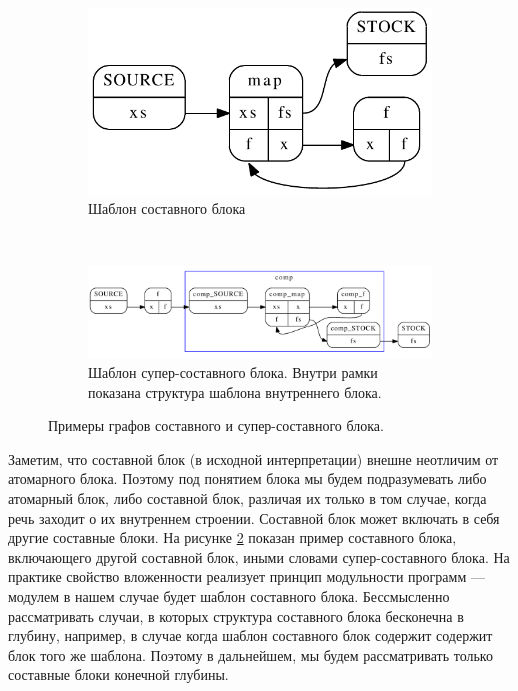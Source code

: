 \documentclass[10pt,a4paper]{article}
\begin{document}
\begin{figure}[H]
  \centering
  \begin{subfigure}[b]{0.3\textwidth}
    \centering
    \includegraphics[width=\textwidth]{example_cg.pdf}
    \caption{Шаблон составного блока}
    \label{example:composite}
  \end{subfigure}
  ~
  \begin{subfigure}[b]{1.0\textwidth}
    \centering
    \includegraphics[width=\textwidth]{cc_cg.pdf}
    \caption{Шаблон супер-составного блока. Внутри рамки показана структура шаблона внутреннего блока.}
    \label{example:supercomposite}
  \end{subfigure}
  
  \caption{ Примеры графов составного и супер-составного блока.}
  \label{example}
\end{figure}

Заметим, что составной блок (в исходной интерпретации) внешне неотличим от атомарного блока.
Поэтому под понятием блока мы будем подразумевать либо атомарный блок, либо составной блок,
различая их только в том случае, когда речь заходит о их внутреннем строении. Составной блок может включать в себя другие составные блоки.
На рисунке \ref{example:supercomposite} показан пример составного блока, включающего другой составной блок, иными словами супер-составного блока.
На практике свойство вложенности реализует принцип модульности программ --- модулем в нашем случае будет шаблон составного блока.
Бессмысленно рассматривать случаи, в которых структура составного блока бесконечна в глубину, например,
в случае когда шаблон составного блок содержит содержит блок того же шаблона. Поэтому в дальнейшем, мы будем рассматривать только составные блоки конечной глубины.
\end{document}
